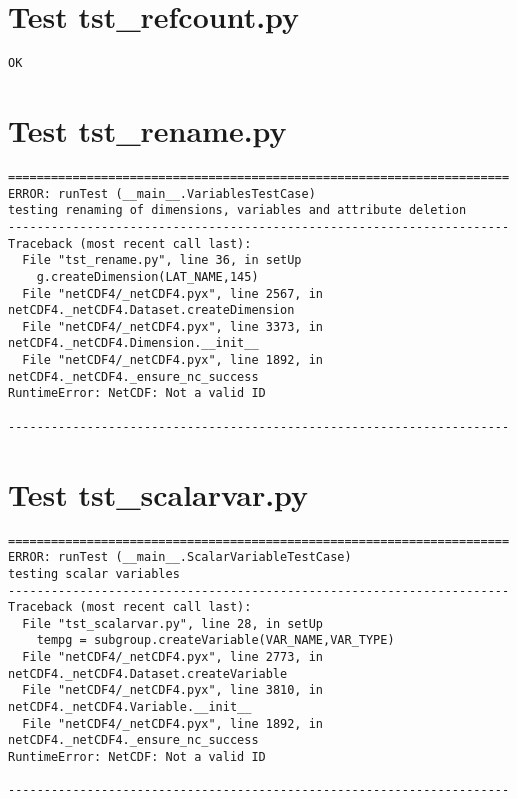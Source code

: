 \section{Test tst\_refcount.py}

\begin{verbatim}
OK
\end{verbatim}

\section{Test tst\_rename.py}

\begin{verbatim}
======================================================================
ERROR: runTest (__main__.VariablesTestCase)
testing renaming of dimensions, variables and attribute deletion
----------------------------------------------------------------------
Traceback (most recent call last):
  File "tst_rename.py", line 36, in setUp
    g.createDimension(LAT_NAME,145)
  File "netCDF4/_netCDF4.pyx", line 2567, in netCDF4._netCDF4.Dataset.createDimension
  File "netCDF4/_netCDF4.pyx", line 3373, in netCDF4._netCDF4.Dimension.__init__
  File "netCDF4/_netCDF4.pyx", line 1892, in netCDF4._netCDF4._ensure_nc_success
RuntimeError: NetCDF: Not a valid ID

----------------------------------------------------------------------
\end{verbatim}

\section{Test tst\_scalarvar.py}

\begin{verbatim}
======================================================================
ERROR: runTest (__main__.ScalarVariableTestCase)
testing scalar variables
----------------------------------------------------------------------
Traceback (most recent call last):
  File "tst_scalarvar.py", line 28, in setUp
    tempg = subgroup.createVariable(VAR_NAME,VAR_TYPE)
  File "netCDF4/_netCDF4.pyx", line 2773, in netCDF4._netCDF4.Dataset.createVariable
  File "netCDF4/_netCDF4.pyx", line 3810, in netCDF4._netCDF4.Variable.__init__
  File "netCDF4/_netCDF4.pyx", line 1892, in netCDF4._netCDF4._ensure_nc_success
RuntimeError: NetCDF: Not a valid ID

----------------------------------------------------------------------
\end{verbatim}

